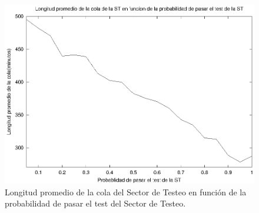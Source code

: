 \documentclass[a4paper,10pt]{article}
\begin{document}
\begin{figure}[ht]
\begin{center}
\includegraphics[width=15cm]{./img/ql_ST.eps}
\caption{\label{fig:ql_ST} Longitud promedio de la cola del Sector de Testeo en funci\'on de la probabilidad de pasar el test del Sector de Testeo.}
\end{center}
\end{figure}
\end{document}
